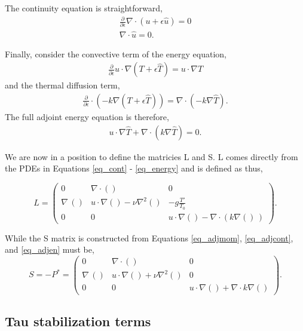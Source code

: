 \documentclass{article}
\begin{document}
The continuity equation is straightforward, 
\begin{align}
 \frac{\partial}{\partial \epsilon} \nabla \cdot (u + \epsilon \hat
 u) = 0 \\
\nabla \cdot \hat u = 0.
\label{eq_adjcont}
\end{align}

Finally, consider the convective term of the energy equation, 
\begin{align}
 \frac{\partial}{\partial \epsilon} u \cdot \nabla (T + \epsilon \hat T)
 = u \cdot \nabla \hat T
\end{align}
and the thermal diffusion term, 
\begin{align}
 \frac{\partial}{\partial \epsilon} \cdot (-k \nabla (T + \epsilon \hat
 T)) = \nabla \cdot (-k \nabla \hat T).
\end{align}
The full adjoint energy equation is therefore, 
\begin{align}
 u \cdot \nabla \hat T + \nabla \cdot (k \nabla \hat T) =0.
\label{eq_adjen}
\end{align}

We are now in a position to define the matricies L and S. L comes
directly from the PDEs in Equations \ref{eq_cont} - \ref{eq_energy} and is
defined as thus, 

\begin{equation}
\renewcommand\arraystretch{2}
 L = 
  \begin{pmatrix}
    0 & \nabla \cdot () & 0   \\
    \nabla \,() & u \cdot \nabla() - \nu \nabla^2() & -g \frac{T'}{T_0}  \\
    0 & 0 & u \cdot \nabla() - \nabla \cdot (k \nabla() \,)
  \end{pmatrix}.
\end{equation}

While the S matrix is constructed from Equations
\ref{eq_adjmom}, \ref{eq_adjcont}, and \ref{eq_adjen} must be, 
\begin{equation}
\renewcommand\arraystretch{2}
 S = -P^* = 
  \begin{pmatrix}
    0 & \nabla \cdot () & 0   \\
    \nabla \,() & u \cdot \nabla() + \nu \nabla^2() & 0  \\
    0 & 0 & u \cdot \nabla() + \nabla \cdot k \nabla()
  \end{pmatrix}.
\end{equation}

%
%
\newpage
\subsection{Tau stabilization terms}
\end{document}
